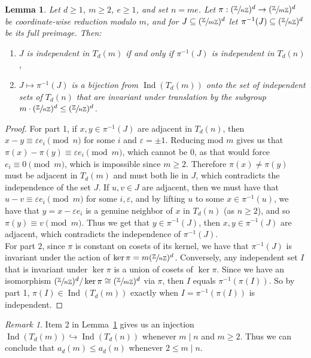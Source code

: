 \documentclass{article}
\theoremstyle{plain}
\newtheorem{lemma}[theorem]{Lemma}
\theoremstyle{definition}
\theoremstyle{remark}
\newtheorem{remark}[theorem]{Remark}
\newcommand{\Z}{\mathbb{Z}}
\newcommand{\quot}[2]{\sfrac{#1}{#2}}
\DeclareMathOperator{\Ind}{Ind}
\begin{document}
\begin{lemma}\label{lem:pullback}
Let $d\ge1$,  $m\ge2$, $e\ge1$, and set $n=me$. Let $\pi:(\quot{\Z}{n\Z})^d\to(\quot{\Z}{m\Z})^d$ be coordinate-wise reduction modulo $m$, and for $J\subseteq(\quot{\Z}{m\Z})^d$ let $\pi^{-1}(J)\subseteq(\quot{\Z}{n\Z})^d$ be its full preimage. Then:
\begin{enumerate}
\item $J$ is independent in $T_d(m)$ if and only if $\pi^{-1}(J)$ is independent in $T_d(n)$,
\item $J\mapsto\pi^{-1}(J)$ is a bijection from $\Ind(T_d(m))$ onto the set of independent sets of $T_d(n)$ that are invariant under translation by the subgroup $m\cdot(\quot{\Z}{n\Z})^d\le(\quot{\Z}{n\Z})^d$.
\end{enumerate}
\end{lemma}
\begin{proof}
For part 1,  if $x,y\in\pi^{-1}(J)$ are adjacent in $T_d(n)$, then $x-y\equiv\varepsilon e_i\pmod n$ for some $i$ and $\varepsilon=\pm1$. Reducing mod $m$ gives us that $\pi(x)-\pi(y)\equiv\varepsilon e_i\pmod m$, which cannot be $0$, as that would force $e_i\equiv0\pmod m$, which is  impossible since $m\ge2$. Therefore $\pi(x)\ne\pi(y)$ must be adjacent in $T_d(m)$ and must both lie in $J$, which contradicts the independence of the set $J$.  If $u,v\in J$ are adjacent, then we must have that $u-v\equiv\varepsilon e_i\pmod m$ for some $i,\varepsilon$, and by lifting $u$ to some $x\in\pi^{-1}(u)$, we have that $y=x-\varepsilon e_i$ is a genuine neighbor of $x$ in $T_d(n)$ (as $n\ge2$), and so $\pi(y)\equiv v\pmod m$. Thus we get that $y\in\pi^{-1}(J)$, then $x,y\in\pi^{-1}(J)$ are adjacent, which contradicts the independence of $\pi^{-1}(J)$.\\

For part 2, since $\pi$ is constant on cosets of its kernel, we have that $\pi^{-1}(J)$ is invariant under the action of $\ker\pi=m(\quot{\Z}{n\Z})^d$. Conversely, any independent set $I$ that is invariant under $\ker\pi$ is a union of cosets of $\ker\pi$. Since we have an isomorphism $(\quot{\Z}{n\Z})^d/\ker\pi\cong(\quot{\Z}{m\Z})^d$ via $\pi$, then $I$ equals $\pi^{-1}(\pi(I))$. So by part 1, $\pi(I)\in\Ind(T_d(m))$ exactly when $I=\pi^{-1}(\pi(I))$ is independent.
\end{proof}

\begin{remark}\label{rem:monotone}
Item 2 in Lemma~\ref{lem:pullback} gives us an injection $\Ind(T_d(m))\hookrightarrow \Ind(T_d(n))$ whenever $m\mid n$ and $m\ge2$. Thus we can conclude that $a_d(m)\le a_d(n)$ whenever $2\le m\mid n$.
\end{remark}
\end{document}
